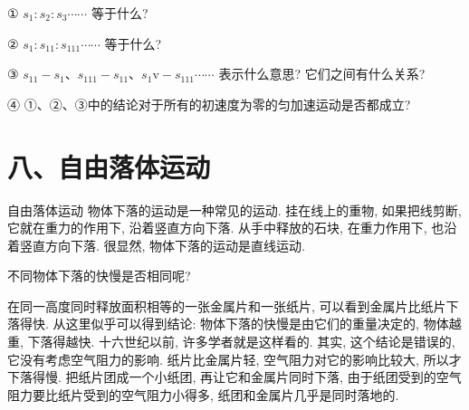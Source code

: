\documentclass[10pt]{article}
\begin{document}
\begin{center}
\end{center}

① \({s}_{1} : {s}_{2} : {s}_{3}\cdots \cdots\) 等于什么?

② \({s}_{1} : {s}_{11} : {s}_{111}\cdots \cdots\) 等于什么?

③ \({s}_{11} - {s}_{1}\text{、}{s}_{111} - {s}_{11}\text{、}{s}_{1}\mathrm{v} - {s}_{111}\cdots \cdots\) 表示什么意思? 它们之间有什么关系?

④ ①、②、③中的结论对于所有的初速度为零的匀加速运动是否都成立?

\section*{八、自由落体运动}

自由落体运动 物体下落的运动是一种常见的运动. 挂在线上的重物, 如果把线剪断, 它就在重力的作用下, 沿着竖直方向下落. 从手中释放的石块, 在重力作用下, 也沿着竖直方向下落. 很显然, 物体下落的运动是直线运动.

不同物体下落的快慢是否相同呢?

在同一高度同时释放面积相等的一张金属片和一张纸片, 可以看到金属片比纸片下落得快. 从这里似乎可以得到结论: 物体下落的快慢是由它们的重量决定的, 物体越重, 下落得越快. 十六世纪以前, 许多学者就是这样看的. 其实, 这个结论是错误的, 它没有考虑空气阻力的影响. 纸片比金属片轻, 空气阻力对它的影响比较大, 所以才下落得慢. 把纸片团成一个小纸团, 再让它和金属片同时下落, 由于纸团受到的空气阻力要比纸片受到的空气阻力小得多, 纸团和金属片几乎是同时落地的.
\end{document}
